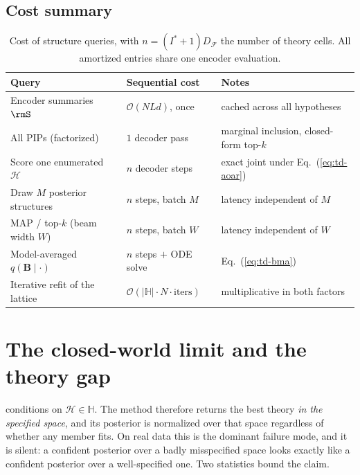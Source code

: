 \documentclass[11pt]{article}
\newcommand{\rmB}{\mathbf{B}}
\providecommand{\cref}[1]{Eq.~(\ref{#1})}
\begin{document}
\subsection{Cost summary}

\begin{table}[h]
\centering
\small
\begin{tabular}{@{}lll@{}}
\toprule
\textbf{Query} & \textbf{Sequential cost} & \textbf{Notes} \\
\midrule
Encoder summaries $\rmS$        & $\mathcal{O}(NLd)$, once & cached across all hypotheses \\
All PIPs (factorized)           & $1$ decoder pass         & marginal inclusion, closed-form top-$k$ \\
Score one enumerated $\mathcal{H}$ & $n$ decoder steps     & exact joint under \cref{eq:td-aoar} \\
Draw $M$ posterior structures   & $n$ steps, batch $M$     & latency independent of $M$ \\
MAP / top-$k$ (beam width $W$)  & $n$ steps, batch $W$     & latency independent of $W$ \\
Model-averaged $q(\rmB\mid\cdot)$ & $n$ steps $+$ ODE solve & \cref{eq:td-bma} \\
\midrule
Iterative refit of the lattice  & $\mathcal{O}(|\mathbb{H}| \cdot N \cdot \text{iters})$ & multiplicative in both factors \\
\bottomrule
\end{tabular}
\caption{Cost of structure queries, with $n = (I^\ast+1)D_\mathcal{F}$ the number of
theory cells. All amortized entries share one encoder evaluation.}
\label{tab:td-cost}
\end{table}

\section{The closed-world limit and the theory gap}

 conditions on $\mathcal{H} \in \mathbb{H}$. The method therefore
returns the best theory \emph{in the specified space}, and its posterior is normalized
over that space regardless of whether any member fits. On real data this is the
dominant failure mode, and it is silent: a confident posterior over a badly
misspecified space looks exactly like a confident posterior over a well-specified one.
Two statistics bound the claim.
\end{document}
